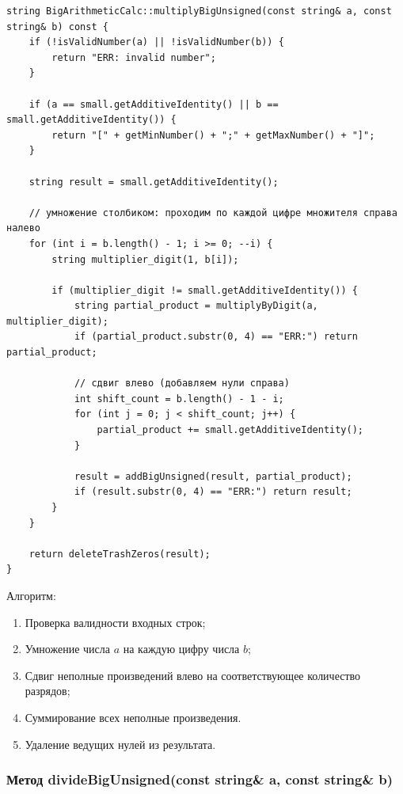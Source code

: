 \begin{lstlisting}[style=cstyle, caption={Реализация multiplyBigUnsigned()}]
string BigArithmeticCalc::multiplyBigUnsigned(const string& a, const string& b) const {
    if (!isValidNumber(a) || !isValidNumber(b)) {
        return "ERR: invalid number";
    }
    
    if (a == small.getAdditiveIdentity() || b == small.getAdditiveIdentity()) {
        return "[" + getMinNumber() + ";" + getMaxNumber() + "]";
    }
    
    string result = small.getAdditiveIdentity();
    
    // умножение столбиком: проходим по каждой цифре множителя справа налево
    for (int i = b.length() - 1; i >= 0; --i) {
        string multiplier_digit(1, b[i]);
        
        if (multiplier_digit != small.getAdditiveIdentity()) {
            string partial_product = multiplyByDigit(a, multiplier_digit);
            if (partial_product.substr(0, 4) == "ERR:") return partial_product;
            
            // сдвиг влево (добавляем нули справа)
            int shift_count = b.length() - 1 - i;
            for (int j = 0; j < shift_count; j++) {
                partial_product += small.getAdditiveIdentity();
            }
            
            result = addBigUnsigned(result, partial_product);
            if (result.substr(0, 4) == "ERR:") return result;
        }
    }
    
    return deleteTrashZeros(result);
}

\end{lstlisting}

Алгоритм: 
\begin{enumerate}
	\item Проверка валидности входных строк;
    \item Умножение числа $a$ на каждую цифру числа $b$;
    \item Сдвиг неполные произведений влево на соответствующее количество разрядов;
    \item Суммирование всех неполные произведения. 
    \item Удаление ведущих нулей из результата.
\end{enumerate}




\subsubsection{Метод divideBigUnsigned(const string\& a, const string\& b)}

